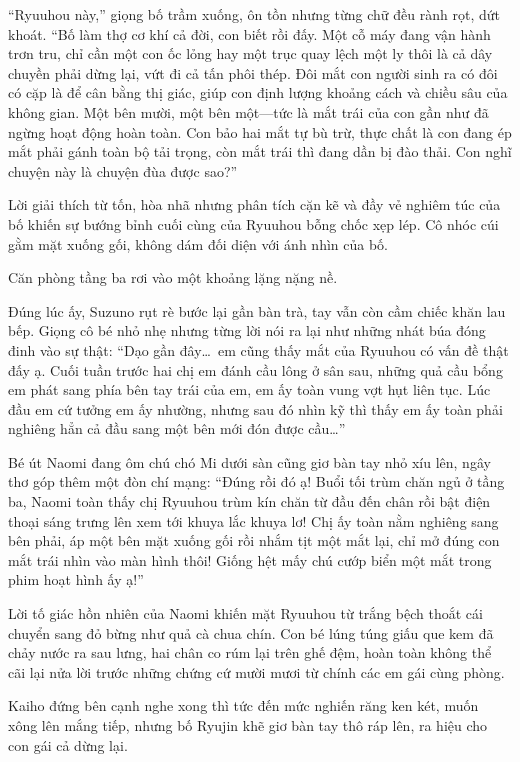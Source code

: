 \documentclass[../main.tex]{subfiles}
\begin{document}
``Ryuuhou này,'' giọng bố trầm xuống, ôn tồn nhưng từng chữ đều rành rọt, dứt khoát. ``Bố làm thợ cơ khí cả đời, con biết rồi đấy. Một cỗ máy đang vận hành trơn tru, chỉ cần một con ốc lỏng hay một trục quay lệch một ly thôi là cả dây chuyền phải dừng lại, vứt đi cả tấn phôi thép. Đôi mắt con người sinh ra có đôi có cặp là để cân bằng thị giác, giúp con định lượng khoảng cách và chiều sâu của không gian. Một bên mười, một bên một—tức là mắt trái của con gần như đã ngừng hoạt động hoàn toàn. Con bảo hai mắt tự bù trừ, thực chất là con đang ép mắt phải gánh toàn bộ tải trọng, còn mắt trái thì đang dần bị đào thải. Con nghĩ chuyện này là chuyện đùa được sao?''

Lời giải thích từ tốn, hòa nhã nhưng phân tích cặn kẽ và đầy vẻ nghiêm túc của bố khiến sự bướng bỉnh cuối cùng của Ryuuhou bỗng chốc xẹp lép. Cô nhóc cúi gằm mặt xuống gối, không dám đối diện với ánh nhìn của bố.

Căn phòng tầng ba rơi vào một khoảng lặng nặng nề.

Đúng lúc ấy, Suzuno rụt rè bước lại gần bàn trà, tay vẫn còn cầm chiếc khăn lau bếp. Giọng cô bé nhỏ nhẹ nhưng từng lời nói ra lại như những nhát búa đóng đinh vào sự thật: ``Dạo gần đây\dots\ em cũng thấy mắt của Ryuuhou có vấn đề thật đấy ạ. Cuối tuần trước hai chị em đánh cầu lông ở sân sau, những quả cầu bổng em phát sang phía bên tay trái của em, em ấy toàn vung vợt hụt liên tục. Lúc đầu em cứ tưởng em ấy nhường, nhưng sau đó nhìn kỹ thì thấy em ấy toàn phải nghiêng hẳn cả đầu sang một bên mới đón được cầu\dots''

Bé út Naomi đang ôm chú chó Mi dưới sàn cũng giơ bàn tay nhỏ xíu lên, ngây thơ góp thêm một đòn chí mạng: ``Đúng rồi đó ạ! Buổi tối trùm chăn ngủ ở tầng ba, Naomi toàn thấy chị Ryuuhou trùm kín chăn từ đầu đến chân rồi bật điện thoại sáng trưng lên xem tới khuya lắc khuya lơ! Chị ấy toàn nằm nghiêng sang bên phải, áp một bên mặt xuống gối rồi nhắm tịt một mắt lại, chỉ mở đúng con mắt trái nhìn vào màn hình thôi! Giống hệt mấy chú cướp biển một mắt trong phim hoạt hình ấy ạ!''

Lời tố giác hồn nhiên của Naomi khiến mặt Ryuuhou từ trắng bệch thoắt cái chuyển sang đỏ bừng như quả cà chua chín. Con bé lúng túng giấu que kem đã chảy nước ra sau lưng, hai chân co rúm lại trên ghế đệm, hoàn toàn không thể cãi lại nửa lời trước những chứng cứ mười mươi từ chính các em gái cùng phòng.

Kaiho đứng bên cạnh nghe xong thì tức đến mức nghiến răng ken két, muốn xông lên mắng tiếp, nhưng bố Ryujin khẽ giơ bàn tay thô ráp lên, ra hiệu cho con gái cả dừng lại.
\end{document}
